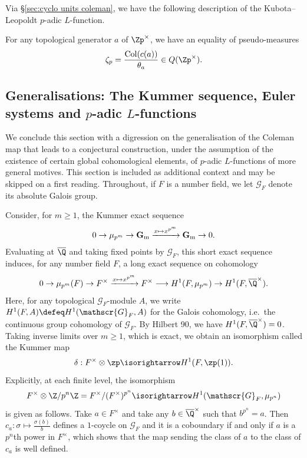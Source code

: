 \documentclass[a4paper,10pt, english, reqno]{smfart}
\numberwithin{equation}{section}
\begin{document}
Via \S\ref{sec:cyclo units coleman}, we have the following description of the Kubota--Leopoldt $p$-adic $L$-function.

\begin{theorem} \label{thm:coleman to kl} 
For any topological generator $a$ of $\Zp^\times$, we have an equality of pseudo-measures 
\[
	\zeta_p = \frac{\mathrm{Col}(c(a))}{\theta_a} \in Q(\Zp^\times).
\]
\end{theorem}




\subsection{Generalisations: The Kummer sequence, Euler systems and $p$-adic $L$-functions}\label{sec:pr log}

We conclude this section with a digression on the generalisation of  the Coleman map that leads to a conjectural construction, under the assumption of the existence of certain global cohomological elements, of $p$-adic $L$-functions of more general motives. This section is included as additional context and may be skipped on a first reading.  Throughout, if $F$ is a number field, we let $\mathscr{G}_F$ denote its absolute Galois group.

Consider, for $m \geq 1$, the Kummer exact sequence
\begin{equation} \label{eq:kummer}
0 \to \mu_{p^m} \to \mathbf{G}_{\rm m} \xrightarrow{x \mapsto x^{p^m}} \mathbf{G}_{\rm m} \to 0.
\end{equation}
Evaluating at $\overline{\Q}$ and taking fixed points by $\mathscr{G}_F$, this short exact sequence induces, for any number field $F$, a long exact sequence on cohomology
\begin{equation}\label{eq:kummer LES}
0 \to \mu_{p^m}(F) \to F^\times \xrightarrow{x \mapsto x^{p^m}} F^\times \longrightarrow H^1(F, \mu_{p^m}) \to H^1(F, \overline{\Q}^\times). 
\end{equation}
Here, for any topological $\mathscr{G}_F$-module $A$, we write $H^1(F, A) \defeq H^1(\mathscr{G}_F, A)$ for the Galois cohomology, i.e.\ the continuous group cohomology of $\mathscr{G}_F$. By Hilbert 90, we have $H^1(F, \overline{\Q}^\times) = 0$. Taking inverse limits over $m \geq 1$, which is exact, we obtain an isomorphism called the Kummer map
\begin{equation} \label{EqKummerMap}
\delta : F^\times \otimes \zp \isorightarrow H^1(F, \zp(1)).
\end{equation}
 Explicitly, at each finite level, the isomorphism 
 \[F^\times \otimes \Z / p^n \Z = F^\times / (F^\times)^{p^n} \isorightarrow H^1(\mathscr{G}_F, \mu_{p^n})\]
is given as follows. Take $a \in F^\times$ and take any $b \in \overline{\Q}^\times$ such that $b^{p^n} = a$. Then $c_a : \sigma \mapsto \frac{\sigma(b)}{b}$ defines a $1$-coycle on $\mathscr{G}_F$ and it is a coboundary if and only if $a$ is a $p^n$th power in $F^\times$, which shows that the map sending the class of $a$ to the class of $c_a$ is well defined. 
\end{document}
